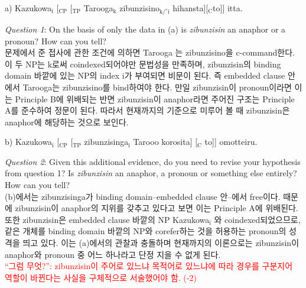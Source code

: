 \documentclass[10pt]{article}
\begin{document}
\subsubsection*{}
\noindent
a) Kazukowa$_{\text{i}}$ [$_{\text{CP}}$ [$_{\text{TP}}$ Tarooga$_{\text{k}}$ zibunzisino$_{\text{k/$^{*}$i}}$ hihansta][$_{\text{C}}$to]] itta.\\
\newline
\begin{spacing}{1.5}
\noindent
\textit{Question 1}: On the basis of only the data in (a) is \textit{zibunzisin} an anaphor or a pronoun? How can you tell?\\
문제에서 준 접사에 관한 조건에 의하면 Tarooga 는 zibunzisino을 c-command한다. 이 두 NP는 k로써 coindexed되어야만 문법성을 만족하며, zibunzisin의 binding domain 바깥에 있는 NP의 index i가 부여되면 비문이 된다. 즉 embedded clause 안에서 Tarooga는 zibunzisino를 bind하여야 한다. 만일 zibunzisin이 pronoun이라면 이는 Principle B에 위배되는 반면 zibunzisin이 anaphor라면 주어진 구조는 Principle A를 준수하여 정문이 된다. 따라서 현재까지의 기준으로 미루어 볼 때 zibunzisin은 anaphor에 해당하는 것으로 보인다.\\
\end{spacing}
\noindent
b) Kazukowa$_{\text{i}}$ [$_{\text{CP}}$ [$_{\text{TP}}$ zibunzisinga$_{\text{i}}$ Tarooo korosita] [$_{\text{C}}$  to]] omotteiru.\\
\newline
\begin{spacing}{1.5}
\noindent
\textit{Question 2}: Given this additional evidence, do you need to revise your hypothesis from question 1? Is \textit{zibunzisin} an anaphor, a pronoun or something else entirely? How can you tell?\\
(b)에서는 zibunzisinga가 binding domain--embedded clause 안--에서 free이다. 때문에 zibunzisin이 anaphor의 지위를 갖추고 있다고 보면 이는 Principle A에 위배된다. 또한 zibunzisin은 embedded clause 바깥의 NP Kazukowa$_{\text{i}}$ 와 coindexed되었으므로, 같은 개체를 binding domain 바깥의 NP와 corefer하는 것을 허용하는 pronoun의 성격을 띄고 있다. 이는 (a)에서의 관찰과 충돌하며 현재까지의 이론으로는 zibunzisin이 anaphor와 pronoun 중 어느 하나라고 단정 지을 수 없게 된다.\\
\textcolor{red}{“그럼 무엇?”: zibunzisin이 주어로 있느냐 목적어로 있느냐에 따라 경우를 구분지어 역할이 바뀐다는 사실을 구체적으로 서술했어야 함. (-2)\\}
\end{spacing}
\noindent
\end{document}

